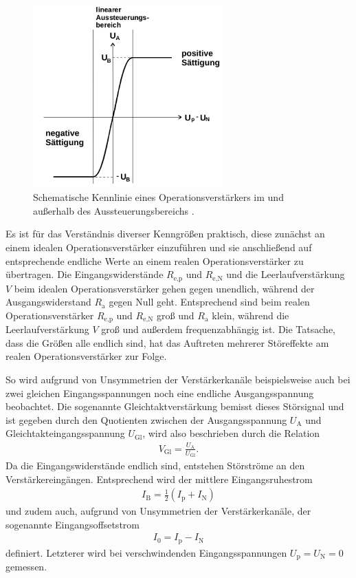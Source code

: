 \begin{figure}
  \centering
  \includegraphics[height=7cm]{ImmerDieseNorweger/kennlinieOPV.png}
  \caption{Schematische Kennlinie eines Operationsverstärkers im und außerhalb des Aussteuerungsbereichs \cite{anleitung}.}
  \label{fig:kennlinieOPV}
\end{figure}

Es ist für das Verständnis diverser Kenngrößen praktisch, diese zunächst an einem idealen Operationsverstärker
einzuführen und sie anschließend auf entsprechende endliche Werte an einem
realen Operationsverstärker zu übertragen. Die Eingangswiderstände $R_\text{e,p}$ und $R_\text{e,N}$
und die Leerlaufverstärkung $V$ beim idealen Operationsverstärker gehen gegen unendlich, während der
Ausgangswiderstand $R_\text{a}$ gegen Null geht. Entsprechend sind beim realen Operationsverstärker
$R_\text{e,p}$ und $R_\text{e,N}$ groß und $R_\text{a}$ klein, während die Leerlaufverstärkung
$V$ groß und außerdem frequenzabhängig ist. Die Tatsache, dass die Größen alle endlich sind, hat das
Auftreten mehrerer Störeffekte am realen Operationsverstärker zur Folge.

So wird aufgrund von Unsymmetrien der Verstärkerkanäle beispielsweise auch bei zwei
gleichen Eingangsspannungen noch eine endliche Ausgangsspannung beobachtet. Die sogenannte Gleichtaktverstärkung
bemisst dieses Störsignal und ist gegeben durch den Quotienten zwischen der Ausgangsspannung $U_\text{A}$ und
Gleichtakteingangsspannung $U_\text{Gl}$, wird also beschrieben durch die Relation
\begin{align}
  V_\text{Gl} = \frac{U_\text{A}}{U_\text{Gl}}.
\end{align}
Da die Eingangswiderstände endlich sind, entstehen Störströme an den Verstärkereingängen.
Entsprechend wird der mittlere Eingangsruhestrom
\begin{align}
  I_\text{B} = \frac12 \left( I_\text{p} + I_\text{N} \right)
\end{align}
und zudem auch, aufgrund von Unsymmetrien der Verstärkerkanäle, der sogenannte
Eingangsoffsetstrom
\begin{align}
  I_0 = I_\text{p} - I_\text{N}
\end{align}
definiert. Letzterer wird bei verschwindenden Eingangsspannungen $U_\text{p} = U_\text{N} = 0$ gemessen.

